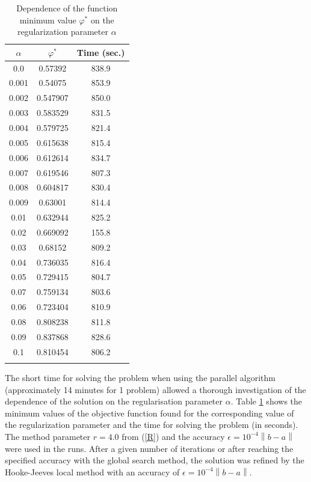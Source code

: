 \documentclass{svproc}
\begin{document}
\begin{table}
\caption{Dependence of the function minimum value $\varphi^*$ on the regularization parameter $\alpha$}
\label{table_1}
\begin{center}
\begin{tabular}{ccc}
\hline\noalign{\smallskip}
 $\alpha$      & $\varphi^*$  & Time (sec.) \\
\hline\noalign{\smallskip}
0.0	    &	0.57392		&	838.9	\\
0.001	&	0.54075		&	853.9	\\
0.002	&	0.547907	&	850.0	\\
0.003	&	0.583529	&	831.5	\\
0.004	&	0.579725	&	821.4	\\
0.005	&	0.615638	&	815.4	\\
0.006	&	0.612614	&	834.7	\\
0.007	&	0.619546	&	807.3	\\
0.008	&	0.604817	&	830.4	\\
0.009	&	0.63001		&	814.4	\\
0.01	&	0.632944	&	825.2	\\
0.02	&	0.669092	&	155.8	\\
0.03	&	0.68152		&	809.2	\\
0.04	&	0.736035	&	816.4	\\
0.05	&	0.729415	&	804.7	\\
0.07	&	0.759134	&	803.6 \\
0.06	&	0.723404	&	810.9	\\
0.08	&	0.808238	&	811.8	\\
0.09	&	0.837868	&	828.6 \\
0.1		&	0.810454	&	806.2	\\
\noalign{\smallskip}\hline
\end{tabular}\end{center}\end{table}

The short time for solving the problem when using the parallel algorithm (approximately 14 minutes for 1 problem) allowed a thorough investigation of the dependence of the solution on the regularisation parameter $\alpha$. Table \ref{table_1} shows the minimum values of the objective function found for the corresponding value of the regularization parameter and the time for solving the problem (in seconds).
The method parameter $r=4.0$ from (\ref{R}) and the accuracy $\epsilon = 10^{-4}\left\|b-a\right\|$ were used in the runs. After a given number of iterations or after reaching the specified accuracy with the global search method, the solution was refined by the Hooke-Jeeves local method \cite{HookJeeves} with an accuracy of $\epsilon = 10^{-4}\left\|b-a\right\|$.
\end{document}
